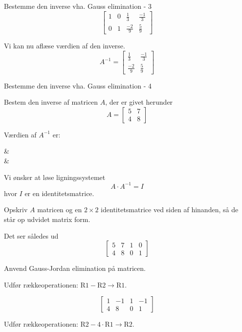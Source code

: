 \documentclass{article}
\begin{document}
\begin{exercise}{Bestemme den inverse vha. Gauss elimination - 3}
	\hint
	\[
	\left[\begin{array}{cc|cc}
	1 & 0 & \frac{1}{3} & \frac{-1}{3} \\ 
	0 & 1 & \frac{-2}{9} & \frac{5}{9}
	\end{array} \right]
	\]
	
	\hint
	Vi kan nu aflæse værdien af den inverse.
	\[
	A^{-1} = \left[\begin{array}{cc}
	\frac{1}{3} & \frac{-1}{3} \\ 
	\frac{-2}{9} & \frac{5}{9}
	\end{array} \right]
	\]
	
	
\end{exercise}


\begin{exercise}{Bestemme den inverse vha. Gauss elimination - 4}
	
	Bestem den inverse af matricen $A$, der er givet herunder
	\[
	A = \left[\begin{array}{cc}
	5 & 7 \\ 
	4 & 8
	\end{array} \right]
	\]
	
	Værdien af $A^{-1}$ er:
	\begin{answermatrix}
		 &  \\
		 & 
	\end{answermatrix}
	
	\hint
	Vi ønsker at løse ligningssystemet
	\[
	A \cdot A^{-1} = I
	\]
	hvor $I$ er en identitetsmatrice.
	
	\hint
	Opskriv $A$ matricen og en $2 \times 2$ identitetsmatrice
	ved siden af hinanden, så de står op udvidet matrix form.
	
	\hint
	Det ser således ud
	\[
	\left[\begin{array}{cc|cc}
	5 & 7 & 1 & 0 \\ 
	4 & 8 & 0 & 1
	\end{array} \right]
	\]
	
	\hint
	Anvend Gauss-Jordan elimination på matricen.
	
	\hint
	Udfør rækkeoperationen: $\text{R1} - \text{R2} \to \text{R1}$.
	
	\hint
	\[
	\left[\begin{array}{cc|cc}
	1 & -1 & 1 & -1 \\ 
	4 & 8 & 0 & 1
	\end{array} \right]
	\]
	
	\hint
	Udfør rækkeoperationen: $\text{R2} - 4 \cdot \text{R1} \to \text{R2}$.
	

\end{exercise}
\end{document}

